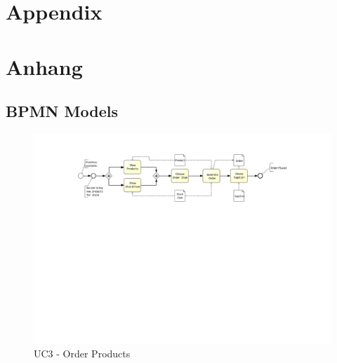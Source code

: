 
{\chapter{Appendix}}    %
{\chapter{Anhang}}      %
\label{ch:appendix}


\section{BPMN Models}
\label{sec:appendix:BPMN Models}
		
\setcounter{figure}{0}
		
\begin{figure}[h!]
	\centering
	\includegraphics[width=\textwidth, trim={6cm 14cm 6cm 1cm}]{img/UC3.pdf}
	\caption{UC3 - Order Products}
	\label{fig:UC3}
\end{figure}


